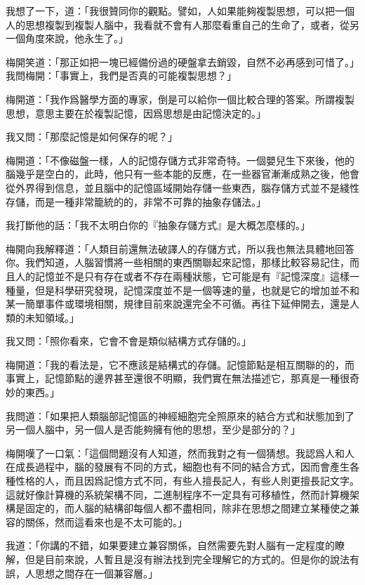 我想了一下，道：「我很贊同你的觀點。譬如，人如果能夠複製思想，可以把一個人的思想複製到複製人腦中，我看就不會有人那麼看重自己的生命了，或者，從另一個角度來說，他永生了。」

梅開笑道：「那正如把一塊已經備份過的硬盤拿去銷毀，自然不必再感到可惜了。」
\\


我問梅開：「事實上，我們是否真的可能複製思想？」

梅開道：「我作爲醫學方面的專家，倒是可以給你一個比較合理的答案。所謂複製思想，意思主要在於複製記憶，因爲思想是由記憶決定的。」

我又問：「那麼記憶是如何保存的呢？」

梅開道：「不像磁盤一樣，人的記憶存儲方式非常奇特。一個嬰兒生下來後，他的腦幾乎是空白的，此時，他只有一些本能的反應，在一些器官漸漸成熟之後，他會從外界得到信息，並且腦中的記憶區域開始存儲一些東西，腦存儲方式並不是綫性存儲，而是一種非常籠統的的，非常不可靠的抽象存儲法。」

我打斷他的話：「我不太明白你的『抽象存儲方式』是大概怎麼樣的。」

梅開向我解釋道：「人類目前還無法破譯人的存儲方式，所以我也無法具體地回答你。我們知道，人腦習慣將一些相關的東西關聯起來記憶，那樣比較容易記住，而且人的記憶並不是只有存在或者不存在兩種狀態，它可能是有『記憶深度』這樣一種量，但是科學研究發現，記憶深度並不是一個等速的量，也就是它的增加並不和某一簡單事件或環境相關，規律目前來說還完全不可循。再往下延伸開去，還是人類的未知領域。」

我又問：「照你看來，它會不會是類似結構方式存儲的。」

梅開道：「我的看法是，它不應該是結構式的存儲。記憶節點是相互關聯的的，而事實上，記憶節點的邊界甚至還很不明顯，我們實在無法描述它，那真是一種很奇妙的東西。」

我問道：「如果把人類腦部記憶區的神經細胞完全照原來的結合方式和狀態加到了另一個人腦中，另一個人是否能夠擁有他的思想，至少是部分的？」

梅開嘆了一口氣：「這個問題沒有人知道，然而我對之有一個猜想。我認爲人和人在成長過程中，腦的發展有不同的方式，細胞也有不同的結合方式，因而會產生各種性格的人，而且因爲記憶方式不同，有些人擅長記人，有些人則更擅長記文字。這就好像計算機的系統架構不同，二進制程序不一定具有可移植性，然而計算機架構是固定的，而人腦的結構卻每個人都不盡相同，除非在思想之間建立某種使之兼容的關係，然而這看來也是不太可能的。」

我道：「你講的不錯，如果要建立兼容關係，自然需要先對人腦有一定程度的瞭解，但是目前來說，人暫且是沒有辦法找到完全理解它的方式的。但是你的說法有誤，人思想之間存在一個兼容層。」

